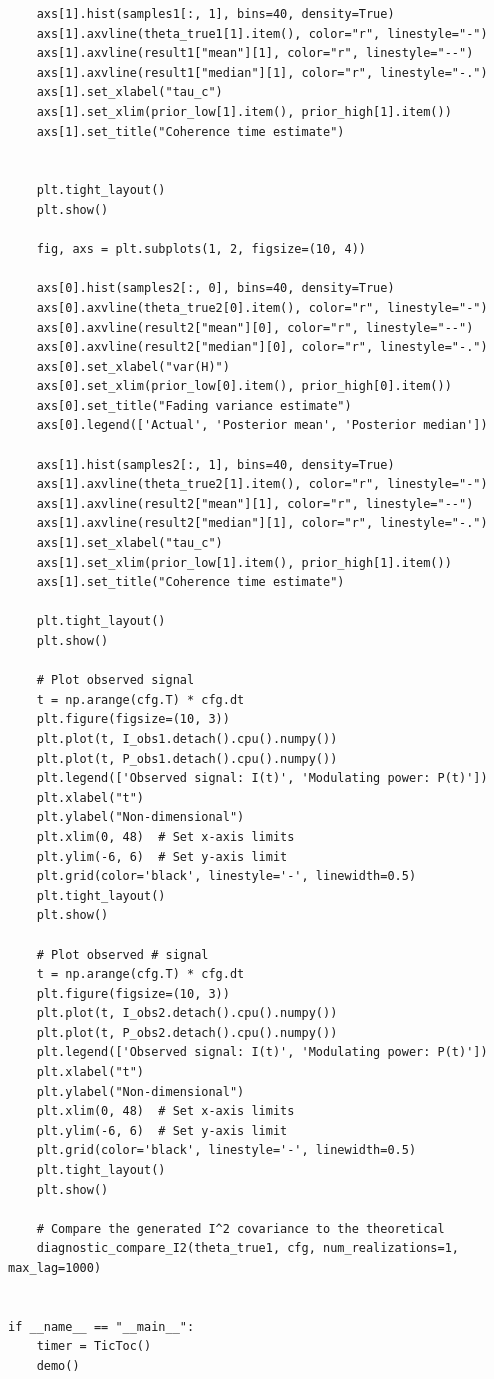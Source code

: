 \documentclass{article}
\begin{document}
\begin{verbatim}
    axs[1].hist(samples1[:, 1], bins=40, density=True)
    axs[1].axvline(theta_true1[1].item(), color="r", linestyle="-")
    axs[1].axvline(result1["mean"][1], color="r", linestyle="--")
    axs[1].axvline(result1["median"][1], color="r", linestyle="-.")
    axs[1].set_xlabel("tau_c")
    axs[1].set_xlim(prior_low[1].item(), prior_high[1].item())
    axs[1].set_title("Coherence time estimate")
    

    plt.tight_layout()
    plt.show()
    
    fig, axs = plt.subplots(1, 2, figsize=(10, 4))

    axs[0].hist(samples2[:, 0], bins=40, density=True)
    axs[0].axvline(theta_true2[0].item(), color="r", linestyle="-")
    axs[0].axvline(result2["mean"][0], color="r", linestyle="--")
    axs[0].axvline(result2["median"][0], color="r", linestyle="-.")
    axs[0].set_xlabel("var(H)")
    axs[0].set_xlim(prior_low[0].item(), prior_high[0].item())
    axs[0].set_title("Fading variance estimate")
    axs[0].legend(['Actual', 'Posterior mean', 'Posterior median'])

    axs[1].hist(samples2[:, 1], bins=40, density=True)
    axs[1].axvline(theta_true2[1].item(), color="r", linestyle="-")
    axs[1].axvline(result2["mean"][1], color="r", linestyle="--")
    axs[1].axvline(result2["median"][1], color="r", linestyle="-.")    
    axs[1].set_xlabel("tau_c")
    axs[1].set_xlim(prior_low[1].item(), prior_high[1].item())
    axs[1].set_title("Coherence time estimate")

    plt.tight_layout()
    plt.show()

    # Plot observed signal
    t = np.arange(cfg.T) * cfg.dt
    plt.figure(figsize=(10, 3))
    plt.plot(t, I_obs1.detach().cpu().numpy())
    plt.plot(t, P_obs1.detach().cpu().numpy())
    plt.legend(['Observed signal: I(t)', 'Modulating power: P(t)'])
    plt.xlabel("t")
    plt.ylabel("Non-dimensional")
    plt.xlim(0, 48)  # Set x-axis limits
    plt.ylim(-6, 6)  # Set y-axis limit
    plt.grid(color='black', linestyle='-', linewidth=0.5)
    plt.tight_layout()
    plt.show()

    # Plot observed # signal
    t = np.arange(cfg.T) * cfg.dt
    plt.figure(figsize=(10, 3))
    plt.plot(t, I_obs2.detach().cpu().numpy())
    plt.plot(t, P_obs2.detach().cpu().numpy())
    plt.legend(['Observed signal: I(t)', 'Modulating power: P(t)'])
    plt.xlabel("t")
    plt.ylabel("Non-dimensional")
    plt.xlim(0, 48)  # Set x-axis limits
    plt.ylim(-6, 6)  # Set y-axis limit
    plt.grid(color='black', linestyle='-', linewidth=0.5)
    plt.tight_layout()
    plt.show()

    # Compare the generated I^2 covariance to the theoretical
    diagnostic_compare_I2(theta_true1, cfg, num_realizations=1, max_lag=1000)


if __name__ == "__main__":
    timer = TicToc()
    demo()

    

\end{verbatim}
\end{document}

